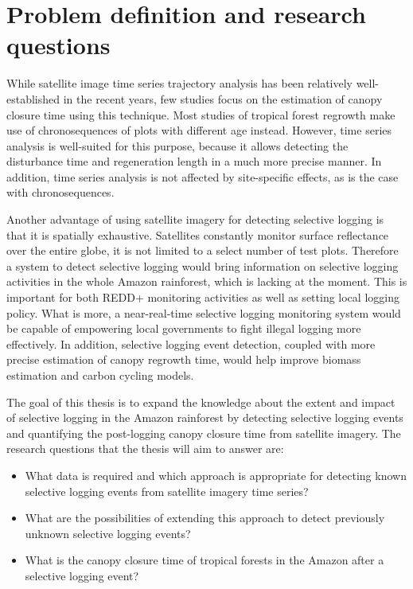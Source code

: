 \documentclass[a4paper,10pt]{article}
\begin{document}
\section{Problem definition and research questions}

While satellite image time series trajectory analysis has been relatively well-established in the recent years, few studies focus on the estimation of canopy closure time using this technique. Most studies of tropical forest regrowth make use of chronosequences of plots with different age instead. However, time series analysis is well-suited for this purpose, because it allows detecting the disturbance time and regeneration length in a much more precise manner. In addition, time series analysis is not affected by site-specific effects, as is the case with chronosequences.

Another advantage of using satellite imagery for detecting selective logging is that it is spatially exhaustive. Satellites constantly monitor surface reflectance over the entire globe, it is not limited to a select number of test plots. Therefore a system to detect selective logging would bring information on selective logging activities in the whole Amazon rainforest, which is lacking at the moment. This is important for both \ac{REDD+} monitoring activities as well as setting local logging policy. What is more, a near-real-time selective logging monitoring system would be capable of empowering local governments to fight illegal logging more effectively. In addition, selective logging event detection, coupled with more precise estimation of canopy regrowth time, would help improve biomass estimation and carbon cycling models.

The goal of this thesis is to expand the knowledge about the extent and impact of selective logging in the Amazon rainforest by detecting selective logging events and quantifying the post-logging canopy closure time from satellite imagery. The research questions that the thesis will aim to answer are:

\begin{itemize}
 \item What data is required and which approach is appropriate for detecting known selective logging events from satellite imagery time series?
 \item What are the possibilities of extending this approach to detect previously unknown selective logging events?
 \item What is the canopy closure time of tropical forests in the Amazon after a selective logging event?
\end{itemize}
\end{document}
